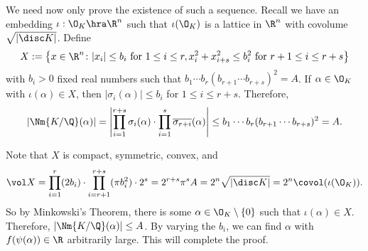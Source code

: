 We need now only prove the existence of such a sequence. Recall we have an embedding $\iota: \O_K \hra \R^n$ such that $\iota(\O_K)$ is a lattice in $\R^n$ with covolume $\sqrt{|\disc K|}$. Define
	\[
	X:= \left\{ x \in \R^n \colon |x_i| \leq b_i \text{ for } 1\leq i \leq r, x_i^2+x_{i+s}^2 \leq b_i^2 \text{ for }r+1 \leq i \leq r+s \right\}
	\]
with $b_i>0$ fixed real numbers such that $b_1\cdots b_r(b_{r+1} \cdots b_{r+s})^2=A$. If $\alpha \in \O_K$ with $\iota(\alpha) \in X$, then $|\sigma_i(\alpha)| \leq b_i$ for $1 \leq i \leq r+s$. Therefore,
	\[
	|\Nm{K/\Q}(\alpha)|= \left| \prod_{i=1}^{r+s} \sigma_i(\alpha) \cdot \prod_{i=1}^s \overline{\sigma_{r+i}}(\alpha) \right| \leq b_1\cdots b_r(b_{r+1}\cdots b_{r+s})^2=A.
	\]


Note that $X$ is compact, symmetric, convex, and
	\[
	\vol X= \prod_{i=1}^r (2b_i) \cdot \prod_{i=r+1}^{r+s} (\pi b_i^2) \cdot 2^s= 2^{r+s} \pi^s A= 2^n \sqrt{|\disc K|} = 2^n \covol(\iota(\O_K)).
	\]
So by Minkowski's Theorem, there is some $\alpha \in \O_K \setminus \{0\}$ such that $\iota(\alpha) \in X$. Therefore, $|\Nm{K/\Q}(\alpha)| \leq A$. By varying the $b_i$, we can find $\alpha$ with $f(\psi(\alpha)) \in \R$ arbitrarily large. This will complete the proof. 


